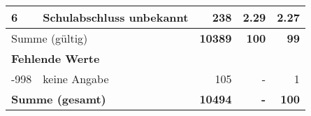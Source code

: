\begin{longtable}{lXrrr}
     6 &
     \multicolumn{1}{X}{ Schulabschluss unbekannt   } &


       \num{238} &
       \num[round-mode=places,round-precision=2]{2.29} &
         \num[round-mode=places,round-precision=2]{2.27} \\
     \midrule
     \multicolumn{2}{l}{Summe (gültig)} &
       \textbf{\num{10389}} &
     \textbf{\num{100}} &
       \textbf{\num[round-mode=places,round-precision=2]{99}} \\
     \multicolumn{5}{l}{\textbf{Fehlende Werte}}\\
       -998 &
       keine Angabe &
         \num{105} &
        - &
         \num[round-mode=places,round-precision=2]{1} \\
     \midrule
     \multicolumn{2}{l}{\textbf{Summe (gesamt)}} &
          \textbf{\num{10494}} &
        \textbf{-} &
        \textbf{\num{100}} \\
     \bottomrule
     \end{longtable}
     

